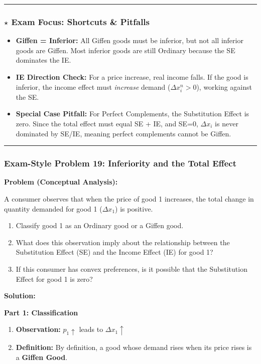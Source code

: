\documentclass{article}
\begin{document}
\noindent\rule{\linewidth}{0.4pt}

\subsubsection*{$\star$ Exam Focus: Shortcuts \& Pitfalls}
\begin{itemize}
    \item \textbf{Giffen = Inferior:} All Giffen goods must be inferior, but not all inferior goods are Giffen. Most inferior goods are still Ordinary because the SE dominates the IE.
    \item \textbf{IE Direction Check:} For a price increase, real income falls. If the good is inferior, the income effect must \textit{increase} demand ($\Delta x_i^n > 0$), working against the SE.
    \item \textbf{Special Case Pitfall:} For Perfect Complements, the Substitution Effect is zero. Since the total effect must equal SE + IE, and SE=0, $\Delta x_i$ is never dominated by SE/IE, meaning perfect complements cannot be Giffen.
\end{itemize}

\noindent\rule{\linewidth}{0.4pt}

\subsubsection*{Exam-Style Problem 19: Inferiority and the Total Effect}
\textbf{Problem (Conceptual Analysis):}

A consumer observes that when the price of good 1 increases, the total change in quantity demanded for good 1 ($\Delta x_1$) is positive.
\begin{enumerate}
    \item Classify good 1 as an Ordinary good or a Giffen good.
    \item What does this observation imply about the relationship between the Substitution Effect (SE) and the Income Effect (IE) for good 1?
    \item If this consumer has convex preferences, is it possible that the Substitution Effect for good 1 is zero?
\end{enumerate}

\textbf{Solution:}

\textbf{Part 1: Classification}
\begin{enumerate}
    \item \textbf{Observation:} $p_1 \uparrow$ leads to $\Delta x_1 \uparrow$
    \item \textbf{Definition:} By definition, a good whose demand rises when its price rises is a \textbf{Giffen Good}.
\end{enumerate}
\end{document}
